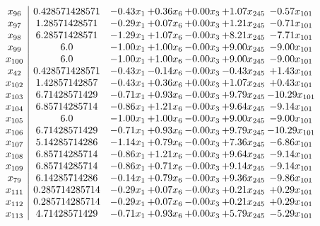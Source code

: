 \documentclass[8pt]{article}
\begin{document}
\[\begin{array}{c| c c@{\hskip 2pt} c@{\hskip 2pt} c@{\hskip 2pt} c@{\hskip 2pt} c@{\hskip 2pt} }
 x_{96}   &  0.428571428571 & -0.43 x_{1} & +  0.36 x_{6} & +  0.00 x_{3} & +  1.07 x_{245} & -0.57 x_{101}\\
 x_{97}   &  1.28571428571 & -0.29 x_{1} & +  0.07 x_{6} & +  0.00 x_{3} & +  1.21 x_{245} & -0.71 x_{101}\\
 x_{98}   &  6.28571428571 & -1.29 x_{1} & +  1.07 x_{6} & -0.00 x_{3} & +  8.21 x_{245} & -7.71 x_{101}\\
 x_{99}   &  6.0 & -1.00 x_{1} & +  1.00 x_{6} & -0.00 x_{3} & +  9.00 x_{245} & -9.00 x_{101}\\
 x_{100}   &  6.0 & -1.00 x_{1} & +  1.00 x_{6} & -0.00 x_{3} & +  9.00 x_{245} & -9.00 x_{101}\\
 x_{42}   &  0.428571428571 & -0.43 x_{1} & -0.14 x_{6} & -0.00 x_{3} & -0.43 x_{245} & +  1.43 x_{101}\\
 x_{102}   &  1.42857142857 & -0.43 x_{1} & +  0.36 x_{6} & +  0.00 x_{3} & +  1.07 x_{245} & +  0.43 x_{101}\\
 x_{103}   &  6.71428571429 & -0.71 x_{1} & +  0.93 x_{6} & -0.00 x_{3} & +  9.79 x_{245} & -10.29 x_{101}\\
 x_{104}   &  6.85714285714 & -0.86 x_{1} & +  1.21 x_{6} & -0.00 x_{3} & +  9.64 x_{245} & -9.14 x_{101}\\
 x_{105}   &  6.0 & -1.00 x_{1} & +  1.00 x_{6} & -0.00 x_{3} & +  9.00 x_{245} & -9.00 x_{101}\\
 x_{106}   &  6.71428571429 & -0.71 x_{1} & +  0.93 x_{6} & -0.00 x_{3} & +  9.79 x_{245} & -10.29 x_{101}\\
 x_{107}   &  5.14285714286 & -1.14 x_{1} & +  0.79 x_{6} & -0.00 x_{3} & +  7.36 x_{245} & -6.86 x_{101}\\
 x_{108}   &  6.85714285714 & -0.86 x_{1} & +  1.21 x_{6} & -0.00 x_{3} & +  9.64 x_{245} & -9.14 x_{101}\\
 x_{109}   &  6.85714285714 & -0.86 x_{1} & +  0.71 x_{6} & -0.00 x_{3} & +  9.14 x_{245} & -9.14 x_{101}\\
 x_{79}   &  6.14285714286 & -0.14 x_{1} & +  0.79 x_{6} & -0.00 x_{3} & +  9.36 x_{245} & -9.86 x_{101}\\
 x_{111}   &  0.285714285714 & -0.29 x_{1} & +  0.07 x_{6} & -0.00 x_{3} & +  0.21 x_{245} & +  0.29 x_{101}\\
 x_{112}   &  0.285714285714 & -0.29 x_{1} & +  0.07 x_{6} & -0.00 x_{3} & +  0.21 x_{245} & +  0.29 x_{101}\\
 x_{113}   &  4.71428571429 & -0.71 x_{1} & +  0.93 x_{6} & +  0.00 x_{3} & +  5.79 x_{245} & -5.29 x_{101}\\

\end{array}\]
\end{document}
